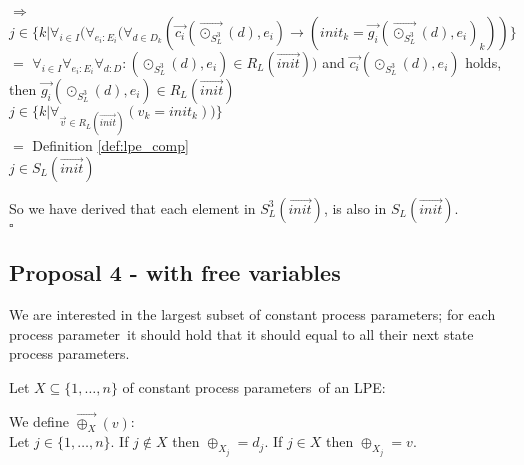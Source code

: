 \index{}\documentclass[a4paper,10pt]{article}
\theoremstyle{plain}
\theoremstyle{definition}
\newcommand{\ovr}{\overrightarrow}
\newcommand{\pp}{process parameter}
\newcommand{\pps}{process parameters}
\newcommand{\sq}{$\square$}
\begin{document}
\begin{defn}
\begin{itemize}
\begin{tabbing}
\> $\Rightarrow$ \> \> \\
\> \> $j \in \lbrace k \vert \forall_{i \in I} (\forall_{e_i:E_i} (\forall_{d\in D_k} (\ovr{c_i}( \ovr{\odot_{S_L^3}}(d), e_i) \rightarrow (init_k = \ovr{g_i} (\ovr{\odot_{S_L^3}}(d), e_i )_k))  \rbrace $ \\
\> $=$ \>  \>$ \forall_{i\in I}\forall_{e_i:E_i}\forall_{d:D} : (\odot_{S_L^3}(d),e_i) \in R_L(\ovr{init})) $ and 
$\ovr{c_i}(\odot_{S_L^3}(d),e_i)$ holds, \\
\> \> \> \> then $ \ovr{g_i}( \odot_{S_L^3}(d),e_i) \in R_L(\ovr{init})$ \\
\> \> $j \in \lbrace k \vert \forall_{\ovr{v} \in R_L(\ovr{init})} (v_k = init_k)) \rbrace$\\
\> $=$ \> \>Definition \ref{def:lpe_comp}\\
\> \> $j \in S_L(\ovr{init})$
 \end{tabbing}
\end{itemize}
So we have derived that each element in $S_L^3(\ovr{init})$, is also in $S_L(\ovr{init})$.
\\ \sq
\end{defn}

\subsection{Proposal 4 - with free variables}

We are interested in the largest subset of constant \pps ; for each \pp\ it should hold that it should equal to all their next state \pps.

Let $X \subseteq \lbrace 1, \ldots, n \rbrace$ of constant \pps\ of an LPE:

\begin{defn} We define $\ovr{\oplus_X}(v)$:\\
Let $j \in \lbrace 1, \dots, n \rbrace $. 
If $j \not\in X$ then $\oplus_{X_j} = d_j$. 
If $j \in X$ then $\oplus_{X_j} = v$.
\end{defn}
\end{document}
